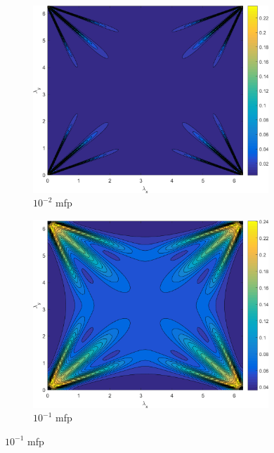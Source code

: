 \begin{figure}
\centering
	{
	\begin{subfigure}[b]{0.485\textwidth}
		\centering
		\includegraphics[width=0.975\textwidth]{figures/sec_DSA/SI_MIP_C=4_UPWLD1_LS4_x=1e-2_dydx=1_contour.png}
		\caption{$10^{-2}$ mfp}
	\end{subfigure}
	\hfill
	\begin{subfigure}[b]{0.485\textwidth}
		\centering
		\includegraphics[width=0.975\textwidth]{figures/sec_DSA/SI_MIP_C=4_UPWLD1_LS4_x=1e-1_dydx=1_contour.png}
		\caption{$10^{-1}$ mfp}
	\end{subfigure}
	}
	\vspace{0.5cm}

\end{figure}
